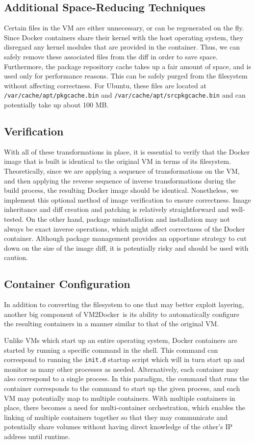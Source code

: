 \documentclass[\myfontsize, letterpaper]{article}
\newcommand{\projectname}{VM2Docker}
\begin{document}
\subsection{Additional Space-Reducing Techniques}
Certain files in the VM are either unnecessary, or can be regenerated on the fly. Since Docker containers share their kernel with the host operating system, they disregard any kernel modules that are provided in the container. Thus, we can safely remove these associated files from the diff in order to save space. Furthermore, the package repository cache takes up a fair amount of space, and is used only for performance reasons. This can be safely purged from the filesystem without affecting correctness. For Ubuntu, these files are located at \texttt{/var/cache/apt/pkgcache.bin} and \texttt{/var/cache/apt/srcpkgcache.bin} and can potentially take up about 100 MB.

\subsection{Verification}
With all of these transformations in place, it is essential to verify that the Docker image that is built is identical to the original VM in terms of its filesystem. Theoretically, since we are applying a sequence of transformations on the VM, and then applying the reverse sequence of inverse transformations during the build process, the resulting Docker image should be identical. Nonetheless, we implement this optional method of image verification to ensure correctness. Image inheritance and diff creation and patching is relatively straightforward and well-tested. On the other hand, package uninstallation and installation may not always be exact inverse operations, which might affect correctness of the Docker container. Although package management provides an opportune strategy to cut down on the size of the image diff, it is potentially risky and should be used with caution.

\subsection{Container Configuration}
In addition to converting the filesystem to one that may better exploit layering, another big component of \projectname\ is its ability to automatically configure the resulting containers in a manner similar to that of the original VM.

Unlike VMs which start up an entire operating system, Docker containers are started by running a specific command in the shell. This command can correspond to running the \texttt{init.d} startup script which will in turn start up and monitor as many other processes as needed. Alternatively, each container may also correspond to a single process. In this paradigm, the command that runs the container corresponds to the command to start up the given process, and each VM may potentially map to multiple containers. With multiple containers in place, there becomes a need for multi-container orchestration, which enables the linking of multiple containers together so that they may communicate and potentially share volumes without having direct knowledge of the other's IP address until runtime. 
\end{document}
